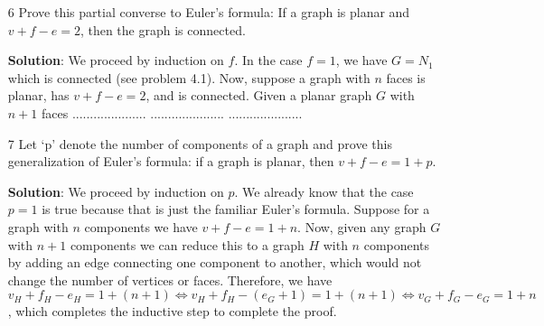 \documentclass{article}
\begin{document}
\begin{enumerate}
	\item[6] Prove this partial converse to Euler's formula: If a graph is planar and $v + f - e = 2$, then the graph is connected.
	
	\textbf{Solution}: We proceed by induction on $f$. In the case $f = 1$, we have $G = N_1$ which is connected (see problem 4.1). Now, suppose a graph with $n$ faces is planar, has $v + f - e = 2$, and is connected. Given a planar graph $G$ with $n + 1$ faces
	.....................
	.....................
	.....................
	
	\item[7] Let `p' denote the number of components of a graph and prove this generalization of Euler's formula: if a graph is planar, then $v + f - e = 1 + p$.
	
	\textbf{Solution}: We proceed by induction on $p$. We already know that the case $p = 1$ is true because that is just the familiar Euler's formula. Suppose for a graph with $n$ components we have $v + f - e = 1 + n$. Now, given any graph $G$ with $n + 1$ components we can reduce this to a graph $H$ with $n$ components by adding an edge connecting one component to another, which would not change the number of vertices or faces. Therefore, we have $v_H + f_H - e_H = 1 + (n + 1) \iff v_H + f_H - (e_G + 1) = 1 + (n + 1) \iff v_G + f_G - e_G = 1 + n$, which completes the inductive step to complete the proof.

\end{enumerate}
\end{document}
